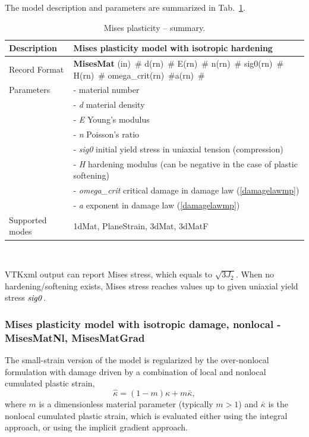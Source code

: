 \documentclass[a4paper]{article}
\newcommand{\descitem}[1]{{\noindent \bf #1}}
\newcommand{\elemparam}[2]{{{#1\tiny (#2)}~\#}}
\newcommand{\param}[1]{{\it #1}}
\newenvironment{mmt}{\begin{tabular}{|l|p{9cm}|}}{\end{tabular}\\}
\newenvironment{mmt}{\begin{tabular}{|l|l|}}{\end{tabular}\\}
\begin{document}
The model description and parameters are summarized in Tab.~\ref{misesMat_table}.
\begin{table}[!htb]
\begin{mmt}
\hline
Description & Mises plasticity model with isotropic hardening\\
\hline
Record Format & \descitem{MisesMat}  \elemparam{}{in}
\elemparam{d}{rn} \elemparam{E}{rn} \elemparam{n}{rn} \elemparam{sig0}{rn} \elemparam{H}{rn} \elemparam{omega\_crit}{rn}\elemparam{a}{rn}\\
Parameters &- \param{} material number\\
&- \param{d} material density\\
&- \param{E} Young's modulus\\
&- \param{n} Poisson's ratio\\
&- \param{sig0} initial yield stress in uniaxial tension (compression)\\
&- \param{H} hardening modulus (can be negative in the case of plastic softening)\\
&- \param{omega\_crit} critical damage in damage law (\ref{damagelawmp})\\
&- \param{a} exponent in damage law (\ref{damagelawmp})\\
Supported modes& 1dMat, PlaneStrain, 3dMat, 3dMatF\\
\hline
\end{mmt}
\caption{Mises plasticity -- summary.}
\label{misesMat_table}
\end{table}

VTKxml output can report Mises stress, which equals to $\sqrt{3J_2}$. When no hardening/softening exists, Mises stress reaches values up to given uniaxial yield stress $\param{sig0}$. 

\subsubsection{Mises plasticity model with isotropic damage, nonlocal - MisesMatNl, MisesMatGrad}
The small-strain version of the model is regularized by the over-nonlocal formulation with damage driven by a combination of local and nonlocal cumulated plastic strain,
\begin{equation}\label{overKappa1}
\hat{\kappa} = (1-m)\kappa + m\bar{\kappa},
\end{equation}
where $m$ is a dimensionless material parameter (typically $m>1$) and $\bar{\kappa}$ is the nonlocal cumulated plastic strain, which is evaluated either using the integral approach,
or using the implicit gradient approach.
\end{document}
